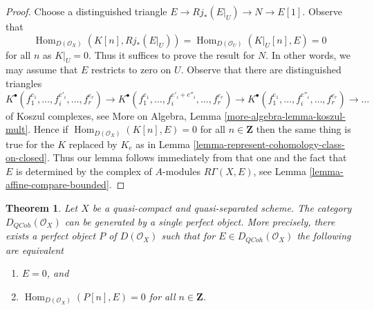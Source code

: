 \documentclass{stacks-project}
\theoremstyle{plain}
\newtheorem{theorem}[subsection]{Theorem}
\theoremstyle{definition}
\theoremstyle{remark}
\numberwithin{equation}{subsection}
\def\Hom{\mathop{\mathrm{Hom}}\nolimits}
\def\QCoh{\mathit{QCoh}}
\begin{document}
\begin{proof}
Choose a distinguished triangle $E \to Rj_*(E|_U) \to N \to E[1]$.
Observe that
$$
\Hom_{D(\mathcal{O}_X)}(K[n], Rj_*(E|_U)) =
\Hom_{D(\mathcal{O}_U)}(K|_U[n], E) = 0
$$
for all $n$ as $K|_U = 0$. Thus it suffices to prove the result for
$N$. In other words, we may assume that $E$ restricts to zero on $U$.
Observe that there are distinguished triangles
$$
K^\bullet(f_1^{e_1}, \ldots, f_i^{e'_i}, \ldots, f_r^{e_r}) \to
K^\bullet(f_1^{e_1}, \ldots, f_i^{e'_i + e''_i}, \ldots, f_r^{e_r}) \to
K^\bullet(f_1^{e_1}, \ldots, f_i^{e''_i}, \ldots, f_r^{e_r}) \to \ldots
$$
of Koszul complexes, see
More on Algebra, Lemma \ref{more-algebra-lemma-koszul-mult}.
Hence if $\Hom_{D(\mathcal{O}_X)}(K[n], E) = 0$ for all $n \in \mathbf{Z}$
then the same thing is true for the $K$ replaced by
$K_e$ as in Lemma \ref{lemma-represent-cohomology-class-on-closed}.
Thus our lemma follows immediately from that one and the fact that $E$
is determined by the complex of $A$-modules $R\Gamma(X, E)$, see
Lemma \ref{lemma-affine-compare-bounded}.
\end{proof}

\begin{theorem}
\label{theorem-bondal-van-den-Bergh}
Let $X$ be a quasi-compact and quasi-separated scheme. The category
$D_\QCoh(\mathcal{O}_X)$ can be generated by a single
perfect object. More precisely, there exists a perfect object
$P$ of $D(\mathcal{O}_X)$ such that for 
$E \in D_\QCoh(\mathcal{O}_X)$ the following are equivalent
\begin{enumerate}
\item $E = 0$, and
\item $\Hom_{D(\mathcal{O}_X)}(P[n], E) = 0$ for all $n \in \mathbf{Z}$.
\end{enumerate}
\end{theorem}
\end{document}
